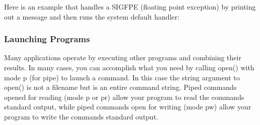 Here is an example that handles a \textsf{SIGFPE} (floating point
exception) by printing out a message and then runs the system default
handler:


\subsubsection[Launching Programs]{Launching Programs}

Many applications operate by executing other programs and combining
their results. In many cases, you can accomplish what you need by
calling \textsf{open()} with mode
\textsf{{\textquotedbl}p{\textquotedbl}} (for pipe) to
launch a command. In this case the string argument to \textsf{open()}
is not a filename but is an entire command string. Piped commands
opened for reading (mode \textsf{{\textquotedbl}p{\textquotedbl}} or
\textsf{{\textquotedbl}pr{\textquotedbl}}) allow your program to read
the command{\textquotesingle}s standard output, while piped commands
open for writing (mode \textsf{{\textquotedbl}pw{\textquotedbl}}) allow
your program to write the command{\textquotesingle}s standard output.

